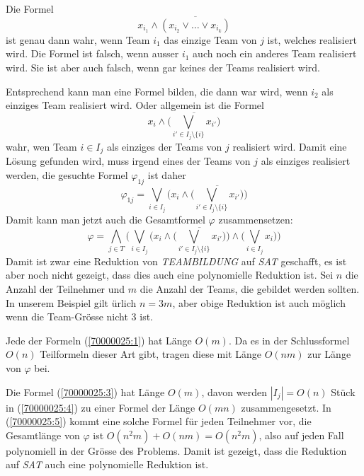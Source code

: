 \begin{loesung}
Die Formel
\begin{equation}
x_{i_1}\wedge\overline{(x_{i_2}\vee\dots\vee x_{i_k})}
\label{70000025:2}
\end{equation}
ist genau dann wahr, wenn Team $i_1$ das einzige Team von $j$ ist,
welches realisiert wird. Die Formel ist falsch, wenn ausser $i_1$ auch
noch ein anderes Team realisiert wird. Sie ist aber auch falsch, wenn 
gar keines der Teams realisiert wird.

Entsprechend kann man eine Formel bilden, die dann war wird, wenn $i_2$ als 
einziges Team realisiert wird. Oder allgemein ist
die Formel
\begin{equation}
x_i\wedge \overline{\biggl(\bigvee_{i'\in I_j\setminus\{i\}}x_{i'}\biggr)}
\label{70000025:3}
\end{equation}
wahr, wen Team $i\in I_j$ als einziges der Teams von $j$ realisiert wird.
Damit eine Lösung gefunden wird, muss irgend eines der Teams von $j$ als
einziges realisiert werden,
die gesuchte Formel $\varphi_{1j}$ ist daher
\begin{equation}
\varphi_{1j} = 
\bigvee_{i\in I_j} \biggl(x_i\wedge
	\overline{\biggl(\bigvee_{i'\in I_j\setminus \{i\}}x_{i'}\biggr)}\biggr)
\label{70000025:4}
\end{equation}
Damit kann man jetzt auch die Gesamtformel $\varphi$ zusammensetzen:
\begin{equation}
\varphi=
\bigwedge_{j\in T}
\biggl(
\bigvee_{i\in I_j} \biggl(x_i\wedge
	\overline{\biggl(\bigvee_{i'\in I_j\setminus \{i\}}x_{i'}\biggr)}\biggr)
\wedge
\biggl(
\bigvee_{i\in I_j}x_i
\biggr)
\biggr)
\label{70000025:5}
\end{equation}
Damit ist zwar eine Reduktion von \textsl{TEAMBILDUNG} auf \textsl{SAT}
geschafft, es ist aber noch nicht gezeigt, dass dies auch eine polynomielle
Reduktion ist. Sei $n$ die Anzahl der Teilnehmer und $m$ die Anzahl der
Teams, die gebildet werden sollten. In unserem Beispiel gilt ürlich $n=3m$,
aber obige Reduktion ist auch möglich wenn die Team-Grösse nicht $3$
ist.

Jede der Formeln (\ref{70000025:1}) hat Länge $O(m)$.
Da es in der Schlussformel $O(n)$ Teilformeln dieser Art gibt, 
tragen diese mit Länge $O(nm)$ zur Länge von $\varphi$ bei.

Die Formel (\ref{70000025:3}) hat Länge $O(m)$, davon werden $|I_j|=O(n)$
Stück
in (\ref{70000025:4}) zu einer Formel der Länge $O(mn)$ zusammengesetzt.
In (\ref{70000025:5}) kommt eine solche Formel für jeden Teilnehmer vor,
die Gesamtlänge von $\varphi$ ist $O(n^2m) + O(nm)=O(n^2m)$, also auf
jeden Fall polynomiell in der Grösse des Problems. Damit ist gezeigt,
dass die Reduktion auf \textsl{SAT} auch eine polynomielle Reduktion ist.
\end{loesung}

